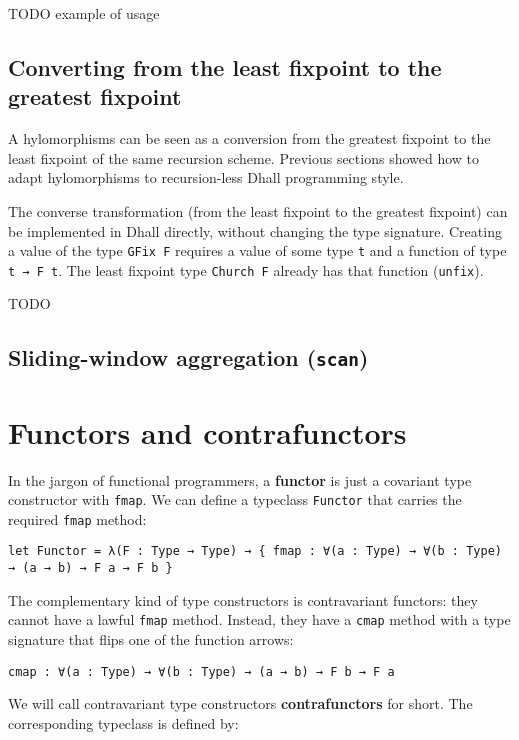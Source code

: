 TODO example of usage


\subsection{Converting from the least fixpoint to the greatest fixpoint}


A hylomorphisms can be seen as a conversion from the greatest fixpoint to the least fixpoint of the same recursion scheme.
Previous sections showed how to adapt hylomorphisms to recursion-less Dhall programming style.


The converse transformation (from the least fixpoint to the greatest fixpoint) can be implemented in Dhall directly, without changing the type signature.
Creating a value of the type \lstinline!GFix F! requires a value of some type \lstinline!t! and a function of type \lstinline!t → F t!.
The least fixpoint type \lstinline!Church F! already has that function (\lstinline!unfix!).


TODO


\subsection{Sliding-window aggregation (\lstinline!scan!)}


\section{Functors and contrafunctors}


In the jargon of functional programmers, a \textbf{functor} is just a covariant type constructor with \lstinline!fmap!.
We can define a typeclass \lstinline!Functor! that carries the required \lstinline!fmap! method: 


\begin{lstlisting}[language=Dhall]
let Functor = λ(F : Type → Type) → { fmap : ∀(a : Type) → ∀(b : Type) → (a → b) → F a → F b }
\end{lstlisting}


The complementary kind of type constructors is contravariant functors: they cannot have a lawful \lstinline!fmap! method.
Instead, they have a \lstinline!cmap! method with a type signature that flips one of the function arrows:


\begin{lstlisting}[language=Dhall]
cmap : ∀(a : Type) → ∀(b : Type) → (a → b) → F b → F a
\end{lstlisting}


We will call contravariant type constructors \textbf{contrafunctors} for short.
The corresponding typeclass is defined by:



